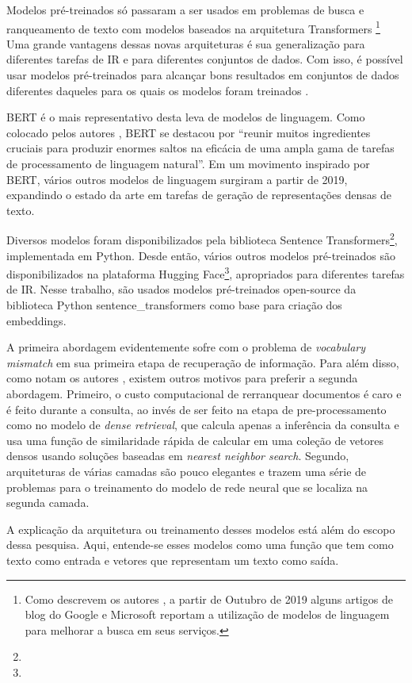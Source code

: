 \documentclass[
	12pt,				%
	openright,			%
	oneside,			%
	a4paper,			%
	english,			%
	french,				%
	spanish,			%
	brazil				%
	]{abntex2}
\begin{document}
Modelos pré-treinados só passaram a ser usados em problemas de busca e ranqueamento de texto com modelos baseados na arquitetura Transformers \cite{}
\footnote{Como descrevem os autores \citeauthor{}, a partir de Outubro de 2019 alguns artigos de blog do Google e Microsoft reportam a utilização de modelos de linguagem para melhorar a busca em seus serviços.}
\cite{DBLP:journals/corr/abs-1810-04805}
Uma grande vantagens dessas novas arquiteturas é sua generalização para diferentes tarefas de IR e para diferentes conjuntos de dados.
Com isso, é possível usar modelos pré-treinados para alcançar bons resultados em conjuntos de dados diferentes daqueles para os quais os modelos foram treinados \cite{}.

BERT \cite{reimers-2019-sentence-bert} é o mais representativo desta leva de modelos de linguagem.
Como colocado pelos autores \citeauthor{biblia}, BERT se destacou por ``reunir muitos ingredientes cruciais para produzir enormes saltos na eficácia de uma ampla gama de tarefas de processamento de linguagem natural''.
Em um movimento inspirado por BERT, vários outros modelos de linguagem surgiram a partir de 2019, expandindo o estado da arte em tarefas de geração de representações densas de texto.

Diversos modelos foram disponibilizados pela biblioteca Sentence Transformers\footnote{}, implementada em Python.
Desde então, vários outros modelos pré-treinados são disponibilizados na plataforma Hugging Face\footnote{},
apropriados para diferentes tarefas de IR.
Nesse trabalho, são usados modelos pré-treinados open-source da biblioteca Python sentence\_transformers como base para criação dos embeddings.

A primeira abordagem evidentemente sofre com o problema de \textit{vocabulary mismatch} em sua primeira etapa de recuperação de informação. Para além disso, como notam os autores \citeauthor{biblia}, existem outros motivos para preferir a segunda abordagem. Primeiro, o custo computacional de rerranquear documentos é caro e é feito durante a consulta, ao invés de ser feito na etapa de pre-processamento como no modelo de \textit{dense retrieval}, que calcula apenas a inferência da consulta e usa uma função de similaridade rápida de calcular em uma coleção de vetores densos usando soluções baseadas em \textit{nearest neighbor search}. Segundo, arquiteturas de várias camadas são pouco elegantes e trazem uma série de problemas para o treinamento do modelo de rede neural que se localiza na segunda camada.

A explicação da arquitetura ou treinamento desses modelos está além do escopo dessa pesquisa.
Aqui, entende-se esses modelos como uma função que tem como texto como entrada e vetores que representam um texto como saída.
\end{document}
